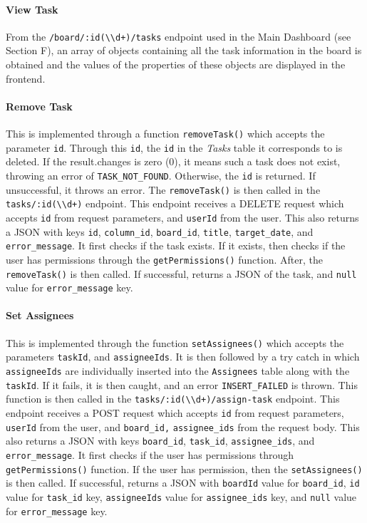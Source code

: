 \documentclass{article}
\def\code#1{\texttt{#1}}
\begin{document}
\paragraph{View Task}
From the \code{/board/:id(\textbackslash{}\textbackslash{}d+)/tasks} endpoint
used in the Main Dashboard (see Section F), an array of objects containing all
the task information in the board is obtained and the values of the properties
of these objects are displayed in the frontend.

\paragraph{Remove Task}
This is implemented through a function \code{removeTask()} which accepts the
parameter \code{id}. Through this \code{id}, the \code{id} in the \emph{Tasks}
table it corresponds to is deleted. If the result.changes is zero (0), it means
such a task does not exist, throwing an error of \code{TASK\_NOT\_FOUND}.
Otherwise, the \code{id} is returned. If unsuccessful, it throws an error. The
\code{removeTask()} is then called in the
\code{tasks/:id(\textbackslash{}\textbackslash{}d+)} endpoint. This endpoint
receives a DELETE request which accepts \code{id} from request parameters, and
\code{userId} from the user. This also returns a JSON with keys \code{id},
\code{column\_id}, \code{board\_id}, \code{title}, \code{target\_date}, and
\code{error\_message}. It first checks if the task exists. If it exists, then
checks if the user has permissions through the \code{getPermissions()} function.
After, the \code{removeTask()} is then called. If successful, returns a JSON of
the task, and \code{null} value for \code{error\_message} key.

\paragraph{Set Assignees}
This is implemented through the function \code{setAssignees()} which accepts the
parameters \code{taskId}, and \code{assigneeIds}. It is then followed by a try
catch in which \code{assigneeIds} are individually inserted into the
\code{Assignees} table along with the \code{taskId}. If it fails, it is then
caught, and an error \code{INSERT\_FAILED} is thrown. This function is then
called in the \code{tasks/:id(\textbackslash{}\textbackslash{}d+)/assign-task}
endpoint. This endpoint receives a POST request which accepts \code{id} from
request parameters, \code{userId} from the user, and \code{board\_id,}
\code{assignee\_ids} from the request body. This also returns a JSON with keys
\code{board\_id}, \code{task\_id}, \code{assignee\_ids}, and
\code{error\_message}. It first checks if the user has permissions through
\code{getPermissions()} function. If the user has permission, then the
\code{setAssignees()} is then called. If successful, returns a JSON with
\code{boardId} value for \code{board\_id}, \code{id} value for \code{task\_id}
key, \code{assigneeIds} value for \code{assignee\_ids} key, and \code{null}
value for \code{error\_message} key.
\end{document}
